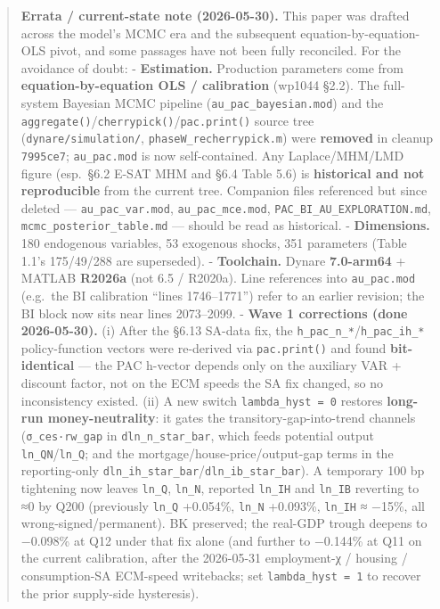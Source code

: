 \documentclass[
]{article}
\begin{document}
\begin{quote}
\textbf{Errata / current-state note (2026-05-30).} This paper was
drafted across the model's MCMC era and the subsequent
equation-by-equation-OLS pivot, and some passages have not been fully
reconciled. For the avoidance of doubt: - \textbf{Estimation.}
Production parameters come from \textbf{equation-by-equation OLS /
calibration} (wp1044 §2.2). The full-system Bayesian MCMC pipeline
(\texttt{au\_pac\_bayesian.mod}) and the
\texttt{aggregate()}/\texttt{cherrypick()}/\texttt{pac.print()} source
tree (\texttt{dynare/simulation/}, \texttt{phaseW\_recherrypick.m}) were
\textbf{removed} in cleanup \texttt{7995ce7}; \texttt{au\_pac.mod} is
now self-contained. Any Laplace/MHM/LMD figure (esp.~§6.2 E-SAT MHM and
§6.4 Table 5.6) is \textbf{historical and not reproducible} from the
current tree. Companion files referenced but since deleted ---
\texttt{au\_pac\_var.mod}, \texttt{au\_pac\_mce.mod},
\texttt{PAC\_BI\_AU\_EXPLORATION.md}, \texttt{mcmc\_posterior\_table.md}
--- should be read as historical. - \textbf{Dimensions.} 180 endogenous
variables, 53 exogenous shocks, 351 parameters (Table 1.1's 175/49/288
are superseded). - \textbf{Toolchain.} Dynare \textbf{7.0-arm64} +
MATLAB \textbf{R2026a} (not 6.5 / R2020a). Line references into
\texttt{au\_pac.mod} (e.g.~the BI calibration ``lines 1746--1771'')
refer to an earlier revision; the BI block now sits near lines
2073--2099. - \textbf{Wave 1 corrections (done 2026-05-30).} (i) After
the §6.13 SA-data fix, the \texttt{h\_pac\_n\_*}/\texttt{h\_pac\_ih\_*}
policy-function vectors were re-derived via \texttt{pac.print()} and
found \textbf{bit-identical} --- the PAC h-vector depends only on the
auxiliary VAR + discount factor, not on the ECM speeds the SA fix
changed, so no inconsistency existed. (ii) A new switch
\texttt{lambda\_hyst\ =\ 0} restores \textbf{long-run money-neutrality}:
it gates the transitory-gap-into-trend channels (\texttt{σ\_ces·rw\_gap}
in \texttt{dln\_n\_star\_bar}, which feeds potential output
\texttt{ln\_QN}/\texttt{ln\_Q}; and the mortgage/house-price/output-gap
terms in the reporting-only
\texttt{dln\_ih\_star\_bar}/\texttt{dln\_ib\_star\_bar}). A temporary
100 bp tightening now leaves \texttt{ln\_Q}, \texttt{ln\_N}, reported
\texttt{ln\_IH} and \texttt{ln\_IB} reverting to ≈0 by Q200 (previously
\texttt{ln\_Q} +0.054\%, \texttt{ln\_N} +0.093\%, \texttt{ln\_IH} ≈
−15\%, all wrong-signed/permanent). BK preserved; the real-GDP trough
deepens to −0.098\% at Q12 under that fix alone (and further to −0.144\%
at Q11 on the current calibration, after the 2026-05-31 employment-χ /
housing / consumption-SA ECM-speed writebacks; set
\texttt{lambda\_hyst\ =\ 1} to recover the prior supply-side
hysteresis).
\end{quote}
\end{document}
